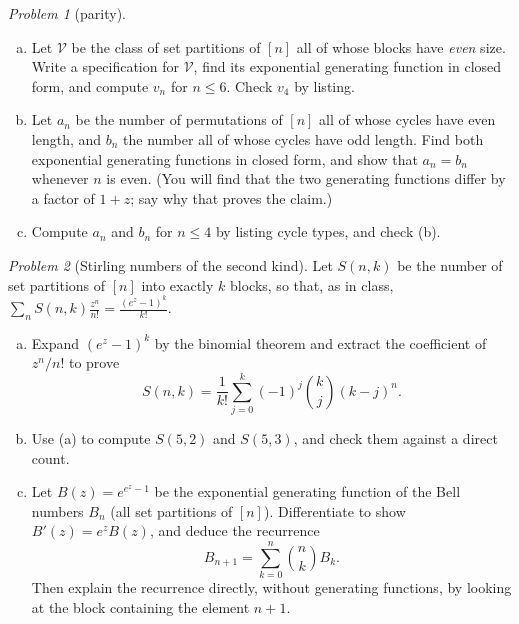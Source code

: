 \documentclass[11pt,twoside]{amsart}
\theoremstyle{plain}
\theoremstyle{remark}
\newtheorem{prob}{Problem}
\theoremstyle{definition}
\begin{document}
\begin{prob}[parity]
\begin{enumerate}[(a)]
\item Let $\mathcal V$ be the class of set partitions of $[n]$ all of whose blocks have
\emph{even} size. Write a specification for $\mathcal V$, find its exponential generating
function in closed form, and compute $v_n$ for $n\le6$. Check $v_4$ by listing.
\item Let $a_n$ be the number of permutations of $[n]$ all of whose cycles have even length, and
$b_n$ the number all of whose cycles have odd length. Find both exponential generating functions
in closed form, and show that $a_n=b_n$ whenever $n$ is even. (You will find that the two
generating functions differ by a factor of $1+z$; say why that proves the claim.)
\item Compute $a_n$ and $b_n$ for $n\le4$ by listing cycle types, and check (b).
\end{enumerate}
\end{prob}

\begin{prob}[Stirling numbers of the second kind]
Let $S(n,k)$ be the number of set partitions of $[n]$ into exactly $k$ blocks, so that, as in
class, $\sum_n S(n,k)\frac{z^n}{n!}=\frac{(e^z-1)^k}{k!}$.
\begin{enumerate}[(a)]
\item Expand $(e^z-1)^k$ by the binomial theorem and extract the coefficient of $z^n/n!$ to prove
\[
S(n,k)=\frac1{k!}\sum_{j=0}^{k}(-1)^{j}\binom kj(k-j)^n .
\]
\item Use (a) to compute $S(5,2)$ and $S(5,3)$, and check them against a direct count.
\item Let $B(z)=e^{e^z-1}$ be the exponential generating function of the Bell numbers $B_n$
(all set partitions of $[n]$). Differentiate to show $B'(z)=e^zB(z)$, and deduce the recurrence
\[
B_{n+1}=\sum_{k=0}^{n}\binom nkB_k .
\]
Then explain the recurrence directly, without generating functions, by looking at the block
containing the element $n+1$.
\end{enumerate}
\end{prob}
\end{document}
